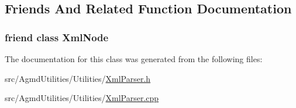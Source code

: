 \subsection{Friends And Related Function Documentation}
\hypertarget{class_agmd_utilities_1_1_xml_parser_a88b009b38305b720f82e3bfc4695b70f}{
\subsubsection[{Xml\+Node}]{\setlength{\rightskip}{0pt plus 5cm}friend class {\bf Xml\+Node}\hspace{0.3cm}{\ttfamily [friend]}}}\label{class_agmd_utilities_1_1_xml_parser_a88b009b38305b720f82e3bfc4695b70f}


The documentation for this class was generated from the following files\+:\begin{DoxyCompactItemize}
\item 
src/\+Agmd\+Utilities/\+Utilities/\hyperlink{_xml_parser_8h}{Xml\+Parser.\+h}\item 
src/\+Agmd\+Utilities/\+Utilities/\hyperlink{_xml_parser_8cpp}{Xml\+Parser.\+cpp}\end{DoxyCompactItemize}
